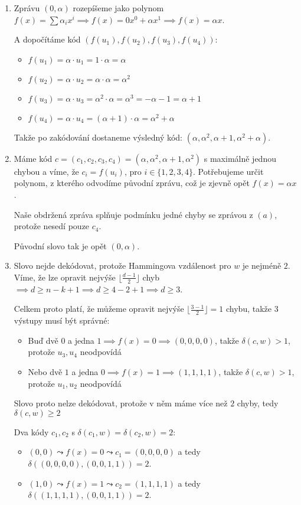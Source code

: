 \documentclass[10pt,a4paper]{article}
\begin{document}
\begin{enumerate}[label=(\alph*)]
    \item Zprávu $(0, \alpha)$ rozepíšeme jako polynom $f(x)=\sum \alpha_ix^i \implies f(x)=0 x^0 + \alpha x^1 \implies f(x)=\alpha x$.
    
    A dopočítáme kód $(f(u_1), f(u_2), f(u_3), f(u_4))$:
    \begin{itemize}
        \item $f(u_1) = \alpha \cdot u_1 = 1\cdot \alpha = \alpha$
        \item $f(u_2) = \alpha \cdot u_2 = \alpha \cdot \alpha = \alpha^2$
        \item $f(u_3) = \alpha \cdot u_3 = \alpha^2 \cdot \alpha = \alpha^3 = -\alpha - 1 = \alpha+1$
        \item $f(u_4) = \alpha \cdot u_4 = (\alpha+1)\cdot \alpha = \alpha^2 + \alpha$
    \end{itemize}
    Takže po zakódování dostaneme výsledný kód: $(\alpha, \alpha^2, \alpha+1, \alpha^2+\alpha)$.
    
    \item Máme kód $c=(c_1, c_2, c_3, c_4)=(\alpha,\alpha^2, \alpha + 1,\alpha^2)$ s maximálně jednou chybou a víme, že $c_i = f(u_i)$, pro $i\in\{1, 2, 3, 4\}$. 
    Potřebujeme určit polynom, z kterého odvodíme původní zprávu, což je zjevně opět $f(x)=\alpha x$.
        
    Naše obdržená zpráva splňuje podmínku jedné chyby se zprávou z $(a)$, protože nesedí pouze $c_4$.
    
    Původní slovo tak je opět $(0, \alpha).$

    \item Slovo nejde dekódovat, protože Hammingova vzdálenost pro $w$ je nejméně $2$.
    Víme, že lze opravit nejvýše $\lfloor \frac{d-1}2 \rfloor$ chyb $\implies d\geq n-k+1 \implies d\geq 4-2+1 \implies d\geq 3$.

    Celkem proto platí, že můžeme opravit nejvýše $\lfloor \frac{3-1}2 \rfloor = 1$ chybu, takže $3$ výstupy musí být správné:

    \begin{itemize}
        \item Buď dvě $0$ a jedna $1 \implies f(x)=0 \implies (0,0,0,0)$, takže $\delta(c,w) > 1$, protože $u_3, u_4$ neodpovídá
        \item Nebo dvě $1$ a jedna $0 \implies f(x)=1 \implies (1,1,1,1)$, takže $\delta(c,w) > 1$, protože $u_1, u_2$ neodpovídá
    \end{itemize}

    Slovo proto nelze dekódovat, protože v něm máme více než $2$ chyby, tedy $\delta(c ,w) \geq 2$

    Dva kódy $c_1, c_2$ s $\delta(c_1 ,w) = \delta(c_2 ,w) = 2$:
    \begin{itemize}
        \item $(0, 0) \leadsto f(x)=0 \leadsto c_1=(0,0,0,0)$ a tedy $\delta((0,0,0,0), (0,0,1,1)) = 2$.
        \item $(1,0) \leadsto f(x) = 1 \leadsto c_2 = (1,1,1,1)$ a tedy $\delta((1,1,1,1), (0,0,1,1)) = 2$.
    \end{itemize}
\end{enumerate}
\end{document}
